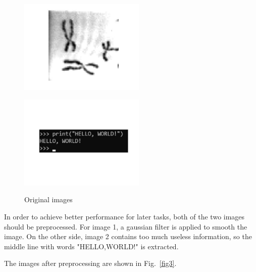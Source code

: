 \documentclass[hyperref]{article}
\theoremstyle{nonumberplain}
\begin{document}
	\begin{figure}[htbp]
		\centering
		\begin{minipage}[t]{0.48\textwidth}
			\centering
			\includegraphics[width=6cm]{fig2a.jpg}
			\label{fig2a}
		\end{minipage}
		\begin{minipage}[t]{0.48\textwidth}
			\centering
			\includegraphics[width=6cm]{fig2b.jpg}
			\label{fig2b}
		\end{minipage}
		\caption{Original images}
	\end{figure}

	In order to achieve better performance for later tasks, both of the two images should be preprocessed. For image 1, a gaussian filter is applied to smooth the image. On the other side, image 2 contains too much useless information, so the middle line with words "HELLO,WORLD!" is extracted.
	
	The images after preprocessing are shown in Fig.~\ref{fig3}.
	
\end{document}

